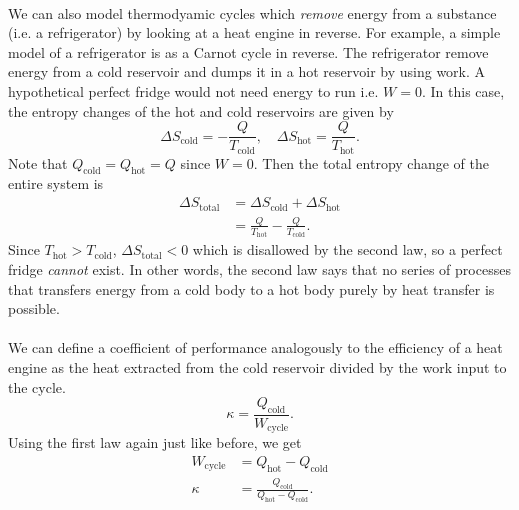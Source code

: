 \documentclass[../thermodynamics.tex]{subfiles}
\begin{document}
        \paragraph{}
        We can also model thermodyamic cycles which \textit{remove} energy from a substance (i.e. a refrigerator) by looking at a heat engine in reverse.
        For example, a simple model of a refrigerator is as a Carnot cycle in reverse.
        The refrigerator remove energy from a cold reservoir and dumps it in a hot reservoir by using work.
        A hypothetical perfect fridge would not need energy to run i.e. $W=0$.
        In this case, the entropy changes of the hot and cold reservoirs are given by
        \begin{equation}
            \Delta S_\text{cold}=-\frac{Q}{T_\text{cold}},\quad\Delta S_\text{hot}=\frac{Q}{T_\text{hot}}.
        \end{equation}
        Note that $Q_\text{cold}=Q_\text{hot}=Q$ since $W=0$.
        Then the total entropy change of the entire system is
        \begin{align}
            \Delta S_\text{total}&=\Delta S_\text{cold}+\Delta S_\text{hot}\\
            &=\frac{Q}{T_\text{hot}}-\frac{Q}{T_\text{cold}}.
        \end{align}
        Since $T_\text{hot}>T_\text{cold}$, $\Delta S_\text{total}<0$ which is disallowed by the second law, so a perfect fridge \textit{cannot} exist.
        In other words, the second law says that no series of processes that transfers energy from a cold body to a hot body purely by heat transfer is possible.

        \paragraph{}
        We can define a coefficient of performance analogously to the efficiency of a heat engine as the heat extracted from the cold reservoir divided by the work input to the cycle.
        \begin{equation}
            \kappa=\frac{Q_\text{cold}}{W_\text{cycle}}.
        \end{equation}
        Using the first law again just like before, we get
        \begin{align}
            W_\text{cycle}&=Q_\text{hot}-Q_\text{cold}\\
            \kappa&=\frac{Q_\text{cold}}{Q_\text{hot}-Q_\text{cold}}.
        \end{align}
\end{document}
